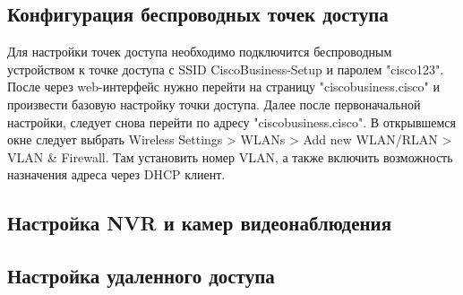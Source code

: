 \subsection{Конфигурация беспроводных точек доступа}
Для настройки точек доступа необходимо подключится беспроводным устройством к точке доступа с SSID CiscoBusiness-Setup
и паролем "cisco123". После через web-интерфейс нужно перейти на страницу "ciscobusiness.cisco" и произвести базовую настройку
точки доступа. Далее после первоначальной настройки, следует снова перейти по адресу "ciscobusiness.cisco". В открывшемся окне
следует выбрать Wireless Settings > WLANs > Add new WLAN/RLAN > VLAN \& Firewall.
Там установить номер VLAN, а также включить возможность назначения адреса через DHCP клиент.

\subsection{Настройка NVR и камер видеонаблюдения}


\subsection{Настройка удаленного доступа}